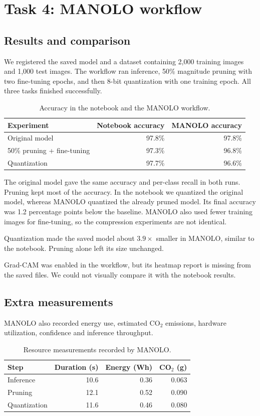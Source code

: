 \documentclass[11pt,a4paper]{article}
\begin{document}
\clearpage
\section{Task 4: MANOLO workflow}
\subsection{Results and comparison}
We registered the saved model and a dataset containing 2,000 training images
and 1,000 test images. The workflow ran inference, 50\% magnitude pruning
with two fine-tuning epochs, and then 8-bit quantization with one training
epoch. All three tasks finished successfully.

\begin{table}[ht]
\centering
\small
\caption{Accuracy in the notebook and the MANOLO workflow.}
\begin{tabular}{lrr}
\toprule
Experiment & Notebook accuracy & MANOLO accuracy\\
\midrule
Original model & 97.8\% & 97.8\%\\
50\% pruning + fine-tuning & 97.3\% & 96.8\%\\
Quantization & 97.7\% & 96.6\%\\
\bottomrule
\end{tabular}
\end{table}

The original model gave the same accuracy and per-class recall in both runs.
Pruning kept most of the accuracy. In the notebook we quantized the original
model, whereas MANOLO quantized the already pruned model. Its final accuracy
was 1.2 percentage points below the baseline. MANOLO also used fewer training
images for fine-tuning, so the compression experiments are not identical.

Quantization made the saved model about $3.9\times$ smaller in MANOLO,
similar to the notebook. Pruning alone left its size unchanged.

Grad-CAM was enabled in the workflow, but its heatmap report is missing from
the saved files. We could not visually compare it with the notebook results.

\subsection{Extra measurements}
MANOLO also recorded energy use, estimated CO$_2$ emissions, hardware
utilization, confidence and inference throughput.

\begin{table}[ht]
\centering
\small
\caption{Resource measurements recorded by MANOLO.}
\begin{tabular}{lrrr}
\toprule
Step & Duration (s) & Energy (Wh) & CO$_2$ (g)\\
\midrule
Inference & 10.6 & 0.36 & 0.063\\
Pruning & 12.1 & 0.52 & 0.090\\
Quantization & 11.6 & 0.46 & 0.080\\
\bottomrule
\end{tabular}
\end{table}
\end{document}

